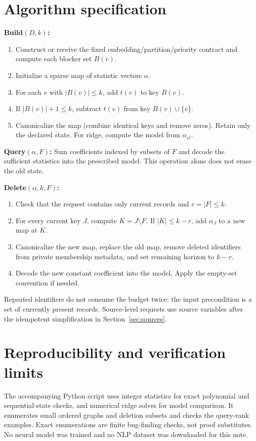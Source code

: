 \documentclass[11pt,a4paper]{article}
\theoremstyle{definition}\newtheorem{definition}[theorem]{Definition}
\newcommand{\minus}{\setminus}
\begin{document}
\section{Algorithm specification}
\textbf{Build$(D,k)$:}
\begin{enumerate}
\item Construct or receive the fixed embedding/partition/priority contract and compute each blocker set $B(v)$.
\item Initialize a sparse map of statistic vectors $\alpha$.
\item For each $v$ with $|B(v)|\le k$, add $t(v)$ to key $B(v)$.
\item If $|B(v)|+1\le k$, subtract $t(v)$ from key $B(v)\cup\{v\}$.
\item Canonicalize the map (combine identical keys and remove zeros). Retain only the declared state. For ridge, compute the model from $\alpha_\varnothing$.
\end{enumerate}
\textbf{Query$(\alpha,F)$:} Sum coefficients indexed by subsets of $F$ and decode the sufficient statistics into the prescribed model. This operation alone does not erase the old state.

\textbf{Delete$(\alpha,k,F)$:}
\begin{enumerate}
\item Check that the request contains only current records and $r=|F|\le k$.
\item For every current key $J$, compute $K=J\minus F$. If $|K|\le k-r$, add $\alpha_J$ to a new map at $K$.
\item Canonicalize the new map, replace the old map, remove deleted identifiers from private membership metadata, and set remaining horizon to $k-r$.
\item Decode the new constant coefficient into the model. Apply the empty-set convention if needed.
\end{enumerate}
Repeated identifiers do not consume the budget twice: the input precondition is a set of currently present records. Source-level requests use source variables after the idempotent simplification in Section~\ref{sec:sources}.

\section{Reproducibility and verification limits}
The accompanying Python script uses integer statistics for exact polynomial and sequential-state checks, and numerical ridge solves for model comparison. It enumerates small ordered graphs and deletion subsets and checks the query-rank examples. Exact enumerations are finite bug-finding checks, not proof substitutes. No neural model was trained and no NLP dataset was downloaded for this note.
\end{document}
